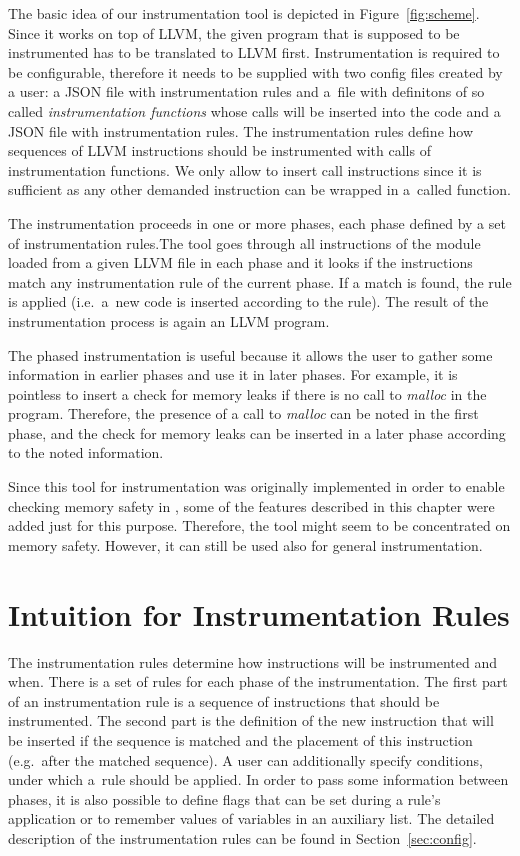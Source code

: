 The basic idea of our instrumentation tool is depicted in
Figure~\ref{fig:scheme}. Since it works on top of LLVM, the given program that
is supposed to be instrumented has to be translated to LLVM first.
Instrumentation is required to be configurable, therefore it needs to be
supplied with two config files created by a user: a JSON file with
instrumentation rules and a~file with definitons of so called
\emph{instrumentation functions} whose calls will be inserted into the code and
a JSON file with instrumentation rules. The instrumentation rules define how
sequences of LLVM instructions should be instrumented with calls of
instrumentation functions.  We only allow to insert call instructions since it
is sufficient as any other demanded instruction can be wrapped in a~called
function.

The instrumentation proceeds in one or more phases, each phase defined by a set
of instrumentation rules.The tool goes through all instructions of the module
loaded from a given LLVM file in each phase and it looks if the instructions
match any instrumentation rule of the current phase. If a match is found, the
rule is applied (i.e.~a~new code is inserted according to the rule). The result
of the instrumentation process is again an LLVM program.

The phased instrumentation is useful because it allows the user to gather some
information in earlier phases and use it in later phases. For example, it is
pointless to insert a check for memory leaks if there is no call to
\emph{malloc} in the program. Therefore, the presence of a call to
\emph{malloc} can be noted in the first phase, and the check for memory leaks
can be inserted in a later phase according to the noted information.

Since this tool for instrumentation was originally implemented in order to
enable checking memory safety in \symbiotic, some of the features described in
this chapter were added just for this purpose. Therefore, the tool might seem
to be concentrated on memory safety. However, it can still be used also for
general instrumentation.

\section{Intuition for Instrumentation Rules}
The instrumentation rules determine how instructions will be instrumented and
when. There is a set of rules for each phase of the instrumentation. The first
part of an instrumentation rule is a sequence of instructions that should be
instrumented. The second part is the definition of the new instruction that
will be inserted if the sequence is matched and the placement of this
instruction (e.g.~after the matched sequence). A user can additionally specify
conditions, under which a~rule should be applied. In order to pass some
information between phases, it is also possible to define flags that can be set
during a rule's application or to remember values of variables in an auxiliary
list. The detailed description of the instrumentation rules can be found in
Section~\ref{sec:config}.

